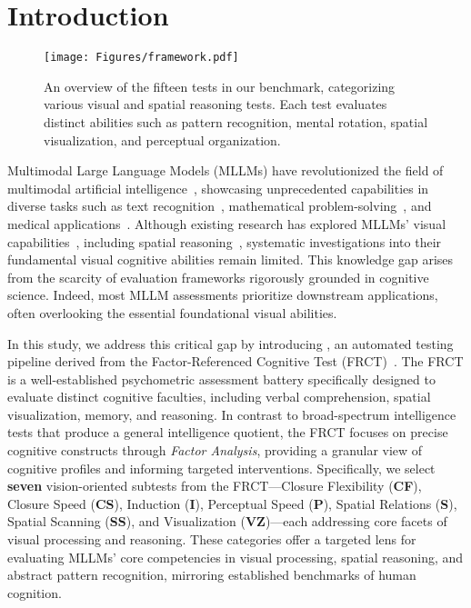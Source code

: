 \section{Introduction}

\begin{figure*}[t]
    \centering
    \texttt{[image: Figures/framework.pdf]}
    \caption{An overview of the fifteen tests in our {\methodname} benchmark, categorizing various visual and spatial reasoning tests. Each test evaluates distinct abilities such as pattern recognition, mental rotation, spatial visualization, and perceptual organization.}
    \label{fig:framework}
\end{figure*}

Multimodal Large Language Models (MLLMs) have revolutionized the field of multimodal artificial intelligence~\cite{bubeck2023sparks, chow2025physbench}, showcasing unprecedented capabilities in diverse tasks such as text recognition~\cite{liu2024ocrbench, chen2025ocean}, mathematical problem-solving~\cite{yang2024mathglm, peng2024multimath}, and medical applications~\cite{azad2023foundational, buckley2023multimodal}.
Although existing research has explored MLLMs' visual capabilities~\cite{fu2024blink, song2024m3gia}, including spatial reasoning~\cite{cai2024spatialbot, cheng2024spatialrgpt}, systematic investigations into their fundamental visual cognitive abilities remain limited.
This knowledge gap arises from the scarcity of evaluation frameworks rigorously grounded in cognitive science.
Indeed, most MLLM assessments prioritize downstream applications, often overlooking the essential foundational visual abilities.

In this study, we address this critical gap by introducing {\methodname}, an automated testing pipeline derived from the Factor-Referenced Cognitive Test (FRCT)~\cite{ekstrom1976manual}.
The FRCT is a well-established psychometric assessment battery specifically designed to evaluate distinct cognitive faculties, including verbal comprehension, spatial visualization, memory, and reasoning.
In contrast to broad-spectrum intelligence tests that produce a general intelligence quotient, the FRCT focuses on precise cognitive constructs through \textit{Factor Analysis}, providing a granular view of cognitive profiles and informing targeted interventions.
Specifically, we select \textbf{seven} vision-oriented subtests from the FRCT—Closure Flexibility (\textbf{CF}), Closure Speed (\textbf{CS}), Induction (\textbf{I}), Perceptual Speed (\textbf{P}), Spatial Relations (\textbf{S}), Spatial Scanning (\textbf{SS}), and Visualization (\textbf{VZ})—each addressing core facets of visual processing and reasoning.
These categories offer a targeted lens for evaluating MLLMs' core competencies in visual processing, spatial reasoning, and abstract pattern recognition, mirroring established benchmarks of human cognition.

